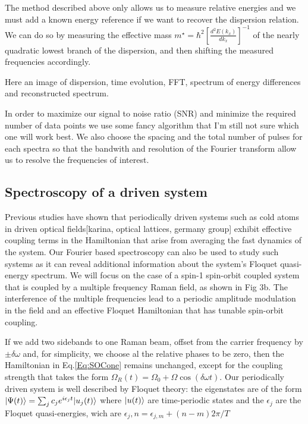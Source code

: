 The method described above only allows us to measure relative energies and we must add a known energy reference if we want to recover the dispersion relation. We can do so by measuring the effective mass $m^{\star} = \hbar^2[\frac{d^2E(k_x)}{dk_x}]^{-1}$ of the nearly quadratic lowest branch of the dispersion, and then shifting the measured frequencies accordingly. 

Here an image of dispersion, time evolution, FFT, spectrum of energy differences and reconstructed spectrum.

In order to maximize our signal to noise ratio (SNR) and minimize the required number of data points we use some fancy algorithm that I'm still not sure which one will work best. We also choose the spacing and the total number of pulses for each spectra so that the bandwith and resolution of the Fourier transform allow us to resolve the frequencies of interest. 



\subsection{Spectroscopy of a driven system}


Previous studies have shown that periodically driven systems such as cold atoms in driven optical fields[karina, optical lattices, germany group] exhibit effective coupling terms in the Hamiltonian that arise from averaging the fast dynamics of the system. Our Fourier based spectroscopy can also be used to study such systems as it can reveal additional information about the system's Floquet quasi-energy spectrum. We will focus on the case of a spin-1 spin-orbit coupled system that is coupled by a multiple frequency Raman field, as shown in Fig 3b. The interference of the multiple frequencies lead to a periodic amplitude modulation in the field and an effective Floquet Hamiltonian that has tunable spin-orbit coupling. 

If we add two sidebands to one Raman beam, offset from the carrier frequency by $\pm \delta\omega$ and, for simplicity, we choose al the relative phases to be zero, then the Hamiltonian in Eq.\ref{Eq:SOCone} remains unchanged, except for the coupling strength that takes the form $	\Omega_R(t)=\Omega_0 + \Omega\cos(\delta\omega t)$. Our periodically driven system is well described by Floquet theory: the eigenstates are of the form $|\Psi(t)\rangle=\sum_{j}c_je^{i\epsilon_jt}|u_j(t)\rangle$ where $|u(t)\rangle$ are time-periodic states and the $\epsilon_j$ are the Floquet quasi-energies, wich are  $\epsilon_j,n=\epsilon_{j,m} + (n-m)2\pi/T$

